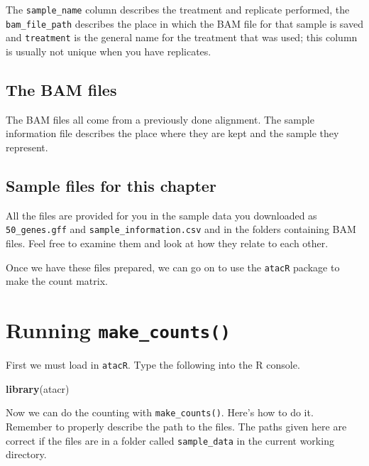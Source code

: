 \documentclass[]{book}
\newenvironment{Shaded}{\begin{snugshade}}{\end{snugshade}}
\newcommand{\KeywordTok}[1]{\textcolor[rgb]{0.13,0.29,0.53}{\textbf{#1}}}
\newcommand{\NormalTok}[1]{#1}
\begin{document}
The \texttt{sample\_name} column describes the treatment and replicate performed, the \texttt{bam\_file\_path} describes the place in which the BAM file for that sample is saved and \texttt{treatment} is the general name for the treatment that was used; this column is usually not unique when you have replicates.

\hypertarget{the-bam-files}{%
\subsection{The BAM files}\label{the-bam-files}}

The BAM files all come from a previously done alignment. The sample information file describes the place where they are kept and the sample they represent.

\hypertarget{sample-files-for-this-chapter}{%
\subsection{Sample files for this chapter}\label{sample-files-for-this-chapter}}

All the files are provided for you in the sample data you downloaded as \texttt{50\_genes.gff} and \texttt{sample\_information.csv} and in the folders containing BAM files. Feel free to examine them and look at how they relate to each other.

Once we have these files prepared, we can go on to use the \texttt{atacR} package to make the count matrix.

\hypertarget{running-make_counts}{%
\section{\texorpdfstring{Running \texttt{make\_counts()}}{Running make\_counts()}}\label{running-make_counts}}

First we must load in \texttt{atacR}. Type the following into the R console.

\begin{Shaded}
\begin{Highlighting}[]
\KeywordTok{library}\NormalTok{(atacr)}
\end{Highlighting}
\end{Shaded}

Now we can do the counting with \texttt{make\_counts()}. Here's how to do it. Remember to properly describe the path to the files. The paths given here are correct if the files are in a folder called \texttt{sample\_data} in the current working directory.
\end{document}
